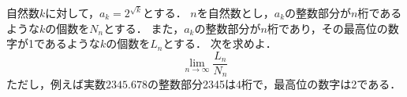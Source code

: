 \documentclass[../../main.tex]{subfiles}
\begin{document}
自然数$k$に対して，$a_k=2^{\sqrt{k}}$とする．
$n$を自然数とし，$a_k$の整数部分が$n$桁であるような$k$の個数を$N_n$とする．
また，$a_k$の整数部分が$n$桁であり，その最高位の数字が1であるような$k$の個数を$L_n$とする．
次を求めよ．
\[ \lim_{n\to\infty}\frac{L_n}{N_n} \]
ただし，例えば実数$2345.678$の整数部分2345は4桁で，最高位の数字は2である．
\end{document}
